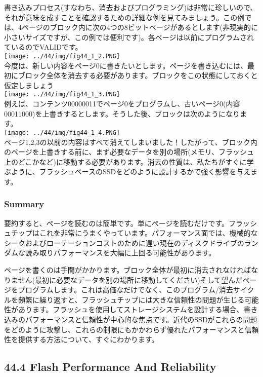 書き込みプロセス(すなわち、消去およびプログラミング)は非常に珍しいので、それが意味を成すことを確認するための詳細な例を見てみましょう。この例では、4ページのブロック内に次の4つの8ビットページがあるとします(非現実的に小さいサイズですが、この例では便利です)。各ページは以前にプログラムされているのでVALIDです。\\
\texttt{[image: ../44/img/fig44\_1\_2.PNG]}\\
今度は、新しい内容をページ0に書きたいとします。ページを書き込むには、最初にブロック全体を消去する必要があります。ブロックをこの状態にしておくと仮定しましょう\\
\texttt{[image: ../44/img/fig44\_1\_3.PNG]}\\
例えば、コンテンツ00000011でページ0をプログラムし、古いページ0(内容00011000)を上書きするとします。そうした後、ブロックは次のようになります。\\
\texttt{[image: ../44/img/fig44\_1\_4.PNG]}\\
ページ1,2,3の以前の内容はすべて消えてしまいました！したがって、ブロック内のページを上書きする前に、まず必要なデータを別の場所(メモリ、フラッシュ上のどこかなど)に移動する必要があります。消去の性質は、私たちがすぐに学ぶように、フラッシュベースのSSDをどのように設計するかで強く影響を与えます。

\hypertarget{summary-31}{%
\subsubsection*{Summary}\label{summary-31}}

要約すると、ページを読むのは簡単です。単にページを読むだけです。フラッシュチップはこれを非常にうまくやっています。パフォーマンス面では、機械的なシークおよびローテーションコストのために遅い現在のディスクドライブのランダムな読み取りパフォーマンスを大幅に上回る可能性があります。

ページを書くのは手間がかかります。ブロック全体が最初に消去されなければなりません(最初に必要なデータを別の場所に移動してください)そして望んだページをプログラムします。これは高価なだけでなく、このプログラム/消去サイクルを頻繁に繰り返すと、フラッシュチップには大きな信頼性の問題が生じる可能性があります。フラッシュを使用してストレージシステムを設計する場合、書き込みのパフォーマンスと信頼性が中心的な焦点です。近代のSSDがこれらの問題をどのように攻撃し、これらの制限にもかかわらず優れたパフォーマンスと信頼性を提供する方法について、すぐにわかります。

\hypertarget{flash-performance-and-reliability}{%
\subsection*{44.4 Flash Performance And
Reliability}\label{flash-performance-and-reliability}}

